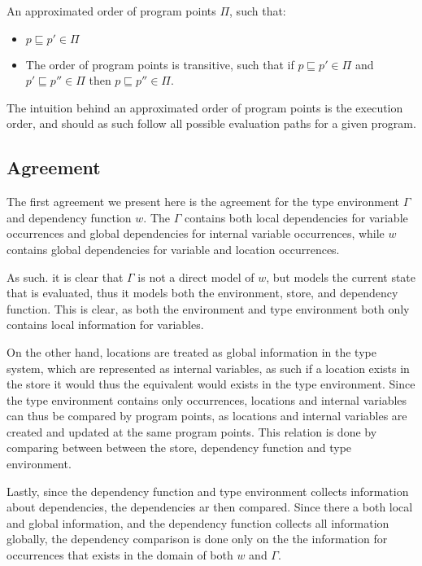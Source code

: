 \documentclass[../../master.tex]{subfiles}
\begin{document}
\begin{definition}
	An approximated order of program points $\Pi$, such that: 
	\begin{itemize}
		\item  $p\sqsubseteq p'\in\Pi$
		\item The order of program points is transitive, such that if $p\sqsubseteq p'\in\Pi$ and $p'\sqsubseteq p''\in\Pi$ then $p\sqsubseteq p''\in\Pi$.
	\end{itemize}
\end{definition}
The intuition behind an approximated order of program points is the execution order, and should as such follow all possible evaluation paths for a given program.

\subsection{Agreement}
The first agreement we present here is the agreement for the type environment $\Gamma$ and dependency function $w$.
The $\Gamma$ contains both local dependencies for variable occurrences and global dependencies for internal variable occurrences, while $w$ contains global dependencies for variable and location occurrences.

As such. it is clear that $\Gamma$ is not a direct model of $w$, but models the current state that is evaluated, thus it models both the environment, store, and dependency function.
This is clear, as both the environment and type environment both only contains local information for variables.

On the other hand, locations are treated as global information in the type system, which are represented as internal variables, as such if a location exists in the store it would thus the equivalent would exists in the type environment.
Since the type environment contains only occurrences, locations and internal variables can thus be compared by program points, as locations and internal variables are created and updated at the same program points.
This relation is done by comparing between between the store, dependency function and type environment.

Lastly, since the dependency function and type environment collects information about dependencies, the dependencies ar then compared.
Since there a both local and global information, and the dependency function collects all information globally, the dependency comparison is done only on the the information  for occurrences that exists in the domain of both $w$ and $\Gamma$.
\end{document}
